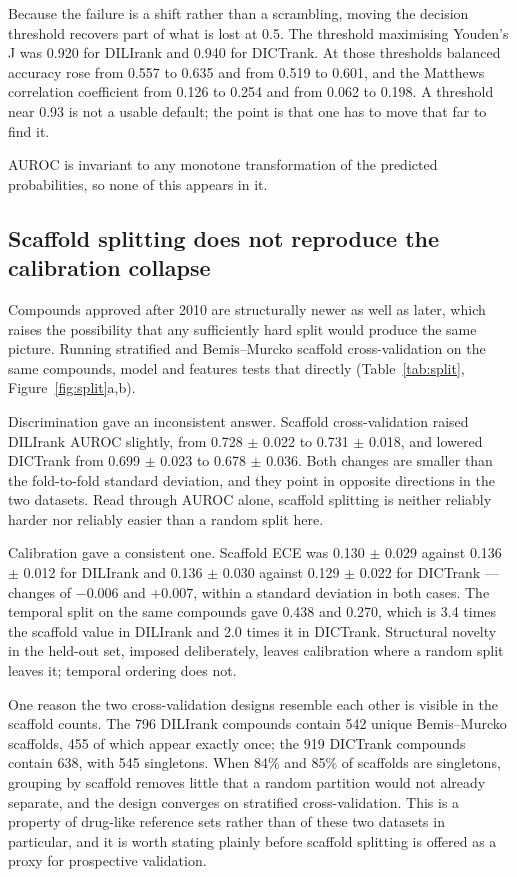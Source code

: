 Because the failure is a shift rather than a scrambling, moving the decision
threshold recovers part of what is lost at 0.5. The threshold maximising Youden's
J was 0.920 for DILIrank and 0.940 for DICTrank. At those thresholds balanced
accuracy rose from 0.557 to 0.635 and from 0.519 to 0.601, and the Matthews
correlation coefficient from 0.126 to 0.254 and from 0.062 to 0.198. A threshold
near 0.93 is not a usable default; the point is that one has to move that far to
find it.

AUROC is invariant to any monotone transformation of the predicted probabilities,
so none of this appears in it.

\subsection{Scaffold splitting does not reproduce the calibration collapse}

Compounds approved after 2010 are structurally newer as well as later, which
raises the possibility that any sufficiently hard split would produce the same
picture. Running stratified and Bemis--Murcko scaffold cross-validation on the
same compounds, model and features tests that directly
(Table~\ref{tab:split}, Figure~\ref{fig:split}a,b).

Discrimination gave an inconsistent answer. Scaffold cross-validation raised
DILIrank AUROC slightly, from 0.728 $\pm$ 0.022 to 0.731 $\pm$ 0.018, and lowered
DICTrank from 0.699 $\pm$ 0.023 to 0.678 $\pm$ 0.036. Both changes are smaller
than the fold-to-fold standard deviation, and they point in opposite directions in
the two datasets. Read through AUROC alone, scaffold splitting is neither reliably
harder nor reliably easier than a random split here.

Calibration gave a consistent one. Scaffold ECE was 0.130 $\pm$ 0.029 against
0.136 $\pm$ 0.012 for DILIrank and 0.136 $\pm$ 0.030 against 0.129 $\pm$ 0.022 for
DICTrank --- changes of $-0.006$ and $+0.007$, within a standard deviation in both
cases. The temporal split on the same compounds gave 0.438 and 0.270, which is
3.4 times the scaffold value in DILIrank and 2.0 times it in DICTrank. Structural
novelty in the held-out set, imposed deliberately, leaves calibration where a
random split leaves it; temporal ordering does not.

One reason the two cross-validation designs resemble each other is visible in the
scaffold counts. The 796 DILIrank compounds contain 542 unique Bemis--Murcko
scaffolds, 455 of which appear exactly once; the 919 DICTrank compounds contain
638, with 545 singletons. When 84\% and 85\% of scaffolds are singletons,
grouping by scaffold removes little that a random partition would not already
separate, and the design converges on stratified cross-validation. This is a
property of drug-like reference sets rather than of these two datasets in
particular, and it is worth stating plainly before scaffold splitting is offered
as a proxy for prospective validation.


